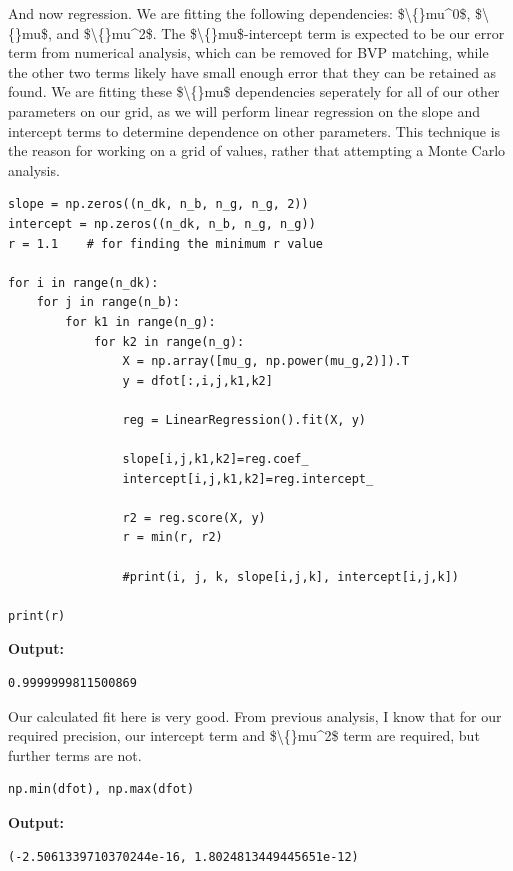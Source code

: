 \documentclass{article}
\begin{document}
And now regression. We are fitting the following dependencies: \$\textbackslash\{\}mu\textasciicircum{}0\$, \$\textbackslash\{\}mu\$, and \$\textbackslash\{\}mu\textasciicircum{}2\$. The \$\textbackslash\{\}mu\$-intercept term is expected to be our error term from numerical analysis, which can be removed for BVP matching, while the other two terms likely have small enough error that they can be retained as found. We are fitting these \$\textbackslash\{\}mu\$ dependencies seperately for all of our other parameters on our grid, as we will perform linear regression on the slope and intercept terms to determine dependence on other parameters. This technique is the reason for working on a grid of values, rather that attempting a Monte Carlo analysis.

\begin{lstlisting}
slope = np.zeros((n_dk, n_b, n_g, n_g, 2))
intercept = np.zeros((n_dk, n_b, n_g, n_g))
r = 1.1    # for finding the minimum r value

for i in range(n_dk):
    for j in range(n_b):
        for k1 in range(n_g):
            for k2 in range(n_g):
                X = np.array([mu_g, np.power(mu_g,2)]).T
                y = dfot[:,i,j,k1,k2]

                reg = LinearRegression().fit(X, y)

                slope[i,j,k1,k2]=reg.coef_
                intercept[i,j,k1,k2]=reg.intercept_

                r2 = reg.score(X, y)
                r = min(r, r2)

                #print(i, j, k, slope[i,j,k], intercept[i,j,k])

print(r)\end{lstlisting}

\textbf{Output:}\begin{verbatim}
0.9999999811500869

\end{verbatim}

Our calculated fit here is very good. From previous analysis, I know that for our required precision, our intercept term and \$\textbackslash\{\}mu\textasciicircum{}2\$ term are required, but further terms are not.

\begin{lstlisting}
np.min(dfot), np.max(dfot)\end{lstlisting}

\textbf{Output:}\begin{verbatim}
(-2.5061339710370244e-16, 1.8024813449445651e-12)
\end{verbatim}
\end{document}
